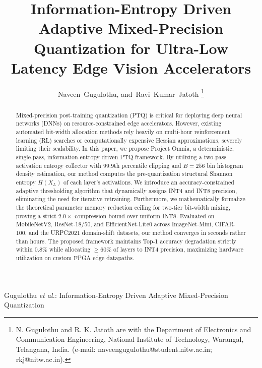 \documentclass[journal]{IEEEtran}
\begin{document}
\title{Information-Entropy Driven Adaptive Mixed-Precision Quantization for Ultra-Low Latency Edge Vision Accelerators}

\author{Naveen~Gugulothu,
        and~Ravi~Kumar~Jatoth
\thanks{N. Gugulothu and R. K. Jatoth are with the Department of Electronics and Communication Engineering, National Institute of Technology, Warangal, Telangana, India. (e-mail: naveengugulothu@student.nitw.ac.in; rkj@nitw.ac.in).}}

%
{Gugulothu \MakeLowercase{\textit{et al.}}: Information-Entropy Driven Adaptive Mixed-Precision Quantization}

\maketitle

\begin{abstract}
Mixed-precision post-training quantization (PTQ) is critical for deploying deep neural networks (DNNs) on resource-constrained edge accelerators. However, existing automated bit-width allocation methods rely heavily on multi-hour reinforcement learning (RL) searches or computationally expensive Hessian approximations, severely limiting their scalability. In this paper, we propose Project Omnia, a deterministic, single-pass, information-entropy driven PTQ framework. By utilizing a two-pass activation entropy collector with 99.9th percentile clipping and $B=256$ bin histogram density estimation, our method computes the pre-quantization structural Shannon entropy $H(X_L)$ of each layer's activations. We introduce an accuracy-constrained adaptive thresholding algorithm that dynamically assigns INT4 and INT8 precision, eliminating the need for iterative retraining. Furthermore, we mathematically formalize the theoretical parameter memory reduction ceiling for two-tier bit-width mixing, proving a strict $2.0\times$ compression bound over uniform INT8. Evaluated on MobileNetV2, ResNet-18/50, and EfficientNet-Lite0 across ImageNet-Mini, CIFAR-100, and the URPC2021 domain-shift datasets, our method converges in seconds rather than hours. The proposed framework maintains Top-1 accuracy degradation strictly within 0.8\% while allocating $\ge 60\%$ of layers to INT4 precision, maximizing hardware utilization on custom FPGA edge datapaths.
\end{abstract}
\end{document}
